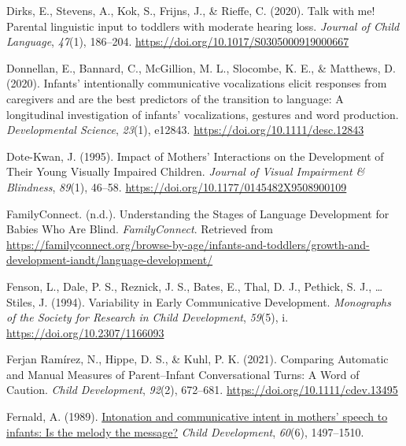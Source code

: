 \documentclass[
  man]{apa6}
\newlength{\cslhangindent}
\newlength{\cslentryspacingunit} %
\newenvironment{CSLReferences}[2] %
 {%
  \setlength{\parindent}{0pt}
  \ifodd #1
  \let\oldpar\par
  \def\par{\hangindent=\cslhangindent\oldpar}
  \fi
  \setlength{\parskip}{#2\cslentryspacingunit}
 }%
 {}
\begin{document}
\begin{CSLReferences}{1}{0}
\leavevmode{}%
Dirks, E., Stevens, A., Kok, S., Frijns, J., \& Rieffe, C. (2020). Talk with me! {Parental} linguistic input to toddlers with moderate hearing loss. \emph{Journal of Child Language}, \emph{47}(1), 186--204. \url{https://doi.org/10.1017/S0305000919000667}

\leavevmode{}%
Donnellan, E., Bannard, C., McGillion, M. L., Slocombe, K. E., \& Matthews, D. (2020). Infants' intentionally communicative vocalizations elicit responses from caregivers and are the best predictors of the transition to language: {A} longitudinal investigation of infants' vocalizations, gestures and word production. \emph{Developmental Science}, \emph{23}(1), e12843. \url{https://doi.org/10.1111/desc.12843}

\leavevmode{}%
Dote-Kwan, J. (1995). Impact of {Mothers}' {Interactions} on the {Development} of {Their} {Young} {Visually} {Impaired} {Children}. \emph{Journal of Visual Impairment \& Blindness}, \emph{89}(1), 46--58. \url{https://doi.org/10.1177/0145482X9508900109}

\leavevmode{}%
FamilyConnect. (n.d.). Understanding the {Stages} of {Language} {Development} for {Babies} {Who} {Are} {Blind}. \emph{FamilyConnect}. Retrieved from \url{https://familyconnect.org/browse-by-age/infants-and-toddlers/growth-and-development-iandt/language-development/}

\leavevmode{}%
Fenson, L., Dale, P. S., Reznick, J. S., Bates, E., Thal, D. J., Pethick, S. J., \ldots{} Stiles, J. (1994). Variability in {Early} {Communicative} {Development}. \emph{Monographs of the Society for Research in Child Development}, \emph{59}(5), i. \url{https://doi.org/10.2307/1166093}

\leavevmode{}%
Ferjan Ramírez, N., Hippe, D. S., \& Kuhl, P. K. (2021). Comparing {Automatic} and {Manual} {Measures} of {Parent}--{Infant} {Conversational} {Turns}: {A} {Word} of {Caution}. \emph{Child Development}, \emph{92}(2), 672--681. \url{https://doi.org/10.1111/cdev.13495}

\leavevmode{}%
Fernald, A. (1989). \href{https://www.ncbi.nlm.nih.gov/pubmed/2612255}{Intonation and communicative intent in mothers' speech to infants: Is the melody the message?} \emph{Child Development}, \emph{60}(6), 1497--1510.


\end{CSLReferences}
\end{document}
